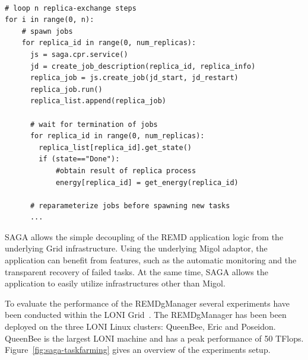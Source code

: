\documentclass[times, 10pt, twocolumn]{article}
\newcommand{\jhanote}[1]{ {\textcolor{red} { ***SJ: #1 }}}
\newcommand{\jhanote}[1]{}
\begin{document}
\begin{lstlisting}[style=myPythonListing, float=t, caption={REMDgManager: Replica Orchestration}, 
label={lst:python_saga_chkpt_reg}]

# loop n replica-exchange steps  
for i in range(0, n):     
    # spawn jobs
    for replica_id in range(0, num_replicas):
      js = saga.cpr.service()
      jd = create_job_description(replica_id, replica_info)    
      replica_job = js.create_job(jd_start, jd_restart)
      replica_job.run()
      replica_list.append(replica_job)
     
      # wait for termination of jobs
      for replica_id in range(0, num_replicas):     
        replica_list[replica_id].get_state()
        if (state=="Done"):                          
            #obtain result of replica process
            energy[replica_id] = get_energy(replica_id)
 
      # reparameterize jobs before spawning new tasks      
      ...                    
\end{lstlisting}     

SAGA allows the simple decoupling of the REMD application logic from the underlying Grid infrastructure. 
Using the underlying Migol adaptor, the application can benefit from features, such as the  automatic monitoring
and the transparent recovery of failed tasks. At the same time, SAGA allows the application to easily utilize 
infrastructures other than Migol.




\label{sec:exp}       
        
To evaluate the performance of the REMDgManager several experiments
have been conducted within the LONI Grid~\cite{Allen:2003xy}. The
REMDgManager has been been deployed on the three LONI Linux clusters: 
QueenBee, Eric and Poseidon.  QueenBee is the largest LONI
machine and has a peak performance of 50 TFlops.
Figure~\ref{fig:saga-taskfarming} gives an overview of the experiments setup.
\end{document}
